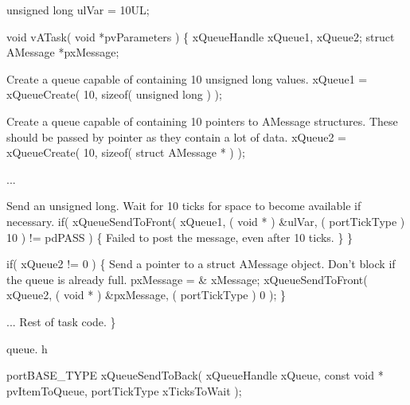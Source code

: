 \begin{DoxyPre} unsigned long ulVar = 10UL;\end{DoxyPre}



\begin{DoxyPre} void vATask( void *pvParameters )
 \{
 xQueueHandle xQueue1, xQueue2;
 struct AMessage *pxMessage;\end{DoxyPre}



\begin{DoxyPre}Create a queue capable of containing 10 unsigned long values.
        xQueue1 = xQueueCreate( 10, sizeof( unsigned long ) );\end{DoxyPre}



\begin{DoxyPre}Create a queue capable of containing 10 pointers to AMessage structures.
These should be passed by pointer as they contain a lot of data.
        xQueue2 = xQueueCreate( 10, sizeof( struct AMessage * ) );\end{DoxyPre}



\begin{DoxyPre}...
\begin{DoxyVerb}    if( xQueue1 != 0 )
    {
\end{DoxyVerb}

Send an unsigned long.  Wait for 10 ticks for space to become
available if necessary.
                if( xQueueSendToFront( xQueue1, ( void * ) \&ulVar, ( portTickType ) 10 ) != pdPASS )
                \{
Failed to post the message, even after 10 ticks.
                \}
        \}\end{DoxyPre}



\begin{DoxyPre}        if( xQueue2 != 0 )
        \{
Send a pointer to a struct AMessage object.  Don't block if the
queue is already full.
                pxMessage = \& xMessage;
                xQueueSendToFront( xQueue2, ( void * ) \&pxMessage, ( portTickType ) 0 );
        \}\end{DoxyPre}



\begin{DoxyPre}... Rest of task code.
 \}
 \end{DoxyPre}


queue. h 
\begin{DoxyPre}
 portBASE\_TYPE xQueueSendToBack(
                                                                   xQueueHandle xQueue,
                                                                   const        void    *       pvItemToQueue,
                                                                   portTickType xTicksToWait
                                                           );
   \end{DoxyPre}



